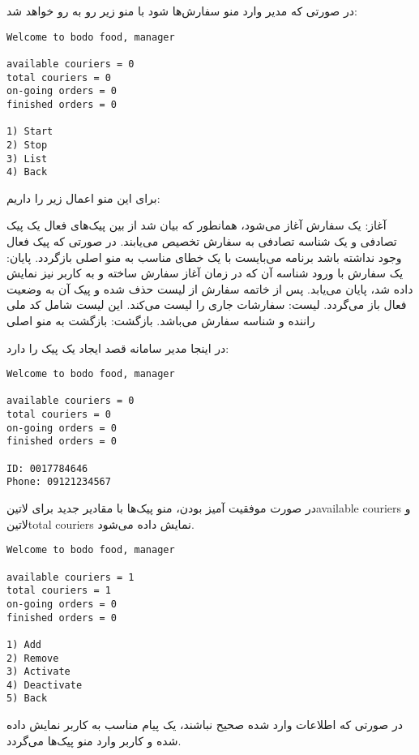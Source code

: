 در صورتی که مدیر وارد منو سفارش‌ها شود با منو زیر رو به رو خواهد شد:

\begin{latin}
\begin{verbatim}
Welcome to bodo food, manager

available couriers = 0
total couriers = 0
on-going orders = 0
finished orders = 0

1) Start
2) Stop
3) List
4) Back
\end{verbatim}
\end{latin}

برای این منو اعمال زیر را داریم:

 آغاز: یک سفارش آغاز می‌شود، همانطور که بیان شد از بین پیک‌های فعال یک پیک تصادفی و یک شناسه تصادفی به سفارش تخصیص می‌یابند. در صورتی که پیک فعال وجود نداشته باشد برنامه می‌بایست با یک خطای مناسب به منو اصلی بازگردد.
 پایان: یک سفارش با ورود شناسه آن که در زمان آغاز سفارش ساخته و به کاربر نیز نمایش داده شد، پایان می‌یابد. پس از خاتمه سفارش از لیست حذف شده و پیک آن به وضعیت فعال باز می‌گردد.
 لیست:‌ سفارشات جاری را لیست می‌کند. این لیست شامل کد ملی راننده و شناسه سفارش می‌باشد.
 بازگشت: بازگشت به منو اصلی

در اینجا مدیر سامانه قصد ایجاد یک پیک را دارد:

\begin{latin}
\begin{verbatim}
Welcome to bodo food, manager

available couriers = 0
total couriers = 0
on-going orders = 0
finished orders = 0

ID: 0017784646
Phone: 09121234567
\end{verbatim}
\end{latin}

در صورت موفقیت آمیز بودن، منو پیک‌ها با مقادیر جدید برای ‌لاتین{available couriers} و ‌لاتین{total couriers} نمایش داده می‌شود.

\begin{latin}
\begin{verbatim}
Welcome to bodo food, manager

available couriers = 1
total couriers = 1
on-going orders = 0
finished orders = 0

1) Add
2) Remove
3) Activate
4) Deactivate
5) Back
\end{verbatim}
\end{latin}

در صورتی که اطلاعات وارد شده صحیح نباشند، یک پیام مناسب به کاربر نمایش داده شده و کاربر وارد منو پیک‌ها می‌گردد.

